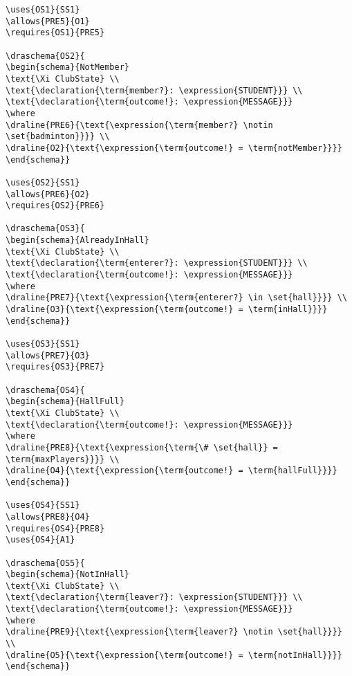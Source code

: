 \begin{verbatim}
\uses{OS1}{SS1}
\allows{PRE5}{O1}
\requires{OS1}{PRE5}

\draschema{OS2}{
\begin{schema}{NotMember}
\text{\Xi ClubState} \\
\text{\declaration{\term{member?}: \expression{STUDENT}}} \\
\text{\declaration{\term{outcome!}: \expression{MESSAGE}}}
\where
\draline{PRE6}{\text{\expression{\term{member?} \notin \set{badminton}}}} \\
\draline{O2}{\text{\expression{\term{outcome!} = \term{notMember}}}}
\end{schema}}

\uses{OS2}{SS1}
\allows{PRE6}{O2}
\requires{OS2}{PRE6}

\draschema{OS3}{
\begin{schema}{AlreadyInHall}
\text{\Xi ClubState} \\
\text{\declaration{\term{enterer?}: \expression{STUDENT}}} \\
\text{\declaration{\term{outcome!}: \expression{MESSAGE}}}
\where
\draline{PRE7}{\text{\expression{\term{enterer?} \in \set{hall}}}} \\
\draline{O3}{\text{\expression{\term{outcome!} = \term{inHall}}}}
\end{schema}}

\uses{OS3}{SS1}
\allows{PRE7}{O3}
\requires{OS3}{PRE7}

\draschema{OS4}{
\begin{schema}{HallFull}
\text{\Xi ClubState} \\
\text{\declaration{\term{outcome!}: \expression{MESSAGE}}}
\where
\draline{PRE8}{\text{\expression{\term{\# \set{hall}} = \term{maxPlayers}}}} \\
\draline{O4}{\text{\expression{\term{outcome!} = \term{hallFull}}}}
\end{schema}}

\uses{OS4}{SS1}
\allows{PRE8}{O4}
\requires{OS4}{PRE8}
\uses{OS4}{A1}

\draschema{OS5}{
\begin{schema}{NotInHall}
\text{\Xi ClubState} \\
\text{\declaration{\term{leaver?}: \expression{STUDENT}}} \\
\text{\declaration{\term{outcome!}: \expression{MESSAGE}}}
\where
\draline{PRE9}{\text{\expression{\term{leaver?} \notin \set{hall}}}} \\
\draline{O5}{\text{\expression{\term{outcome!} = \term{notInHall}}}}
\end{schema}}


\end{verbatim}
